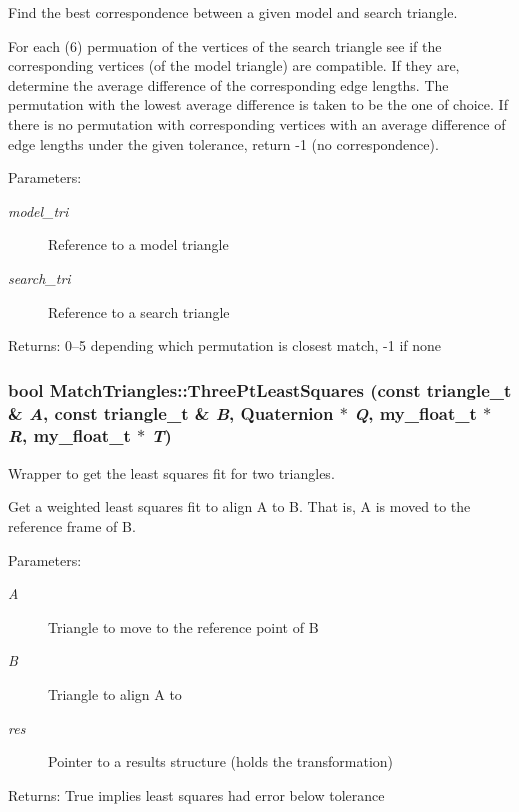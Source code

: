 Find the best correspondence between a given model and search triangle. 

For each (6) permuation of the vertices of the search triangle see if the corresponding vertices (of the model triangle) are compatible. If they are, determine the average difference of the corresponding edge lengths. The permutation with the lowest average difference is taken to be the one of choice. If there is no permutation with corresponding vertices with an average difference of edge lengths under the given tolerance, return -1 (no correspondence).

\begin{Desc}
\item[Parameters:]
\begin{description}
\item[{\em model\_\-tri}]Reference to a model triangle \item[{\em search\_\-tri}]Reference to a search triangle \end{description}
\end{Desc}
\begin{Desc}
\item[Returns:]0--5 depending which permutation is closest match, -1 if none \end{Desc}
\subsubsection{\setlength{\rightskip}{0pt plus 5cm}bool Match\-Triangles::Three\-Pt\-Least\-Squares (const \bf{triangle\_\-t} \& {\em A}, const \bf{triangle\_\-t} \& {\em B}, Quaternion $\ast$ {\em Q}, my\_\-float\_\-t $\ast$ {\em R}, my\_\-float\_\-t $\ast$ {\em T})\hspace{0.3cm}{\tt  [private]}}\label{classSimSite3D_1_1MatchTriangles_434d4cfe074a18dd8d79b46b5585b559}


Wrapper to get the least squares fit for two triangles. 

Get a weighted least squares fit to align A to B. That is, A is moved to the reference frame of B.

\begin{Desc}
\item[Parameters:]
\begin{description}
\item[{\em A}]Triangle to move to the reference point of B \item[{\em B}]Triangle to align A to \item[{\em res}]Pointer to a results structure (holds the transformation) \end{description}
\end{Desc}
\begin{Desc}
\item[Returns:]True implies least squares had error below tolerance \end{Desc}


